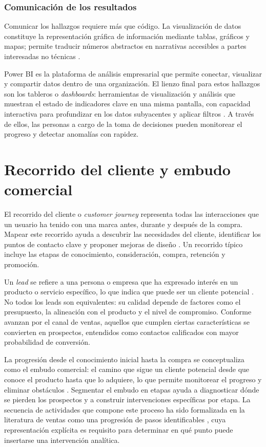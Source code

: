 \subsubsection{Comunicación de los resultados}

Comunicar los hallazgos requiere más que código. La visualización de datos
constituye la representación gráfica de información mediante tablas, gráficos y
mapas; permite traducir números abstractos en narrativas accesibles a partes
interesadas no técnicas \cite{tableau_dataviz}.

Power BI es la plataforma de análisis empresarial que permite conectar, visualizar
y compartir datos dentro de una organización. El lienzo final para estos hallazgos
son los tableros o \emph{dashboards}: herramientas de visualización y análisis que
muestran el estado de indicadores clave en una misma pantalla, con capacidad
interactiva para profundizar en los datos subyacentes y aplicar filtros
\cite{hashemipour2024dashboard}. A través de ellos, las personas a cargo de la toma
de decisiones pueden monitorear el progreso y detectar anomalías con rapidez.

\section{Recorrido del cliente y embudo comercial}

El recorrido del cliente o \emph{customer journey} representa todas las
interacciones que un usuario ha tenido con una marca antes, durante y después de la
compra. Mapear este recorrido ayuda a descubrir las necesidades del cliente,
identificar los puntos de contacto clave y proponer mejoras de diseño
\cite{miller2025journey}. Un recorrido típico incluye las etapas de conocimiento,
consideración, compra, retención y promoción.

Un \emph{lead} se refiere a una persona o empresa que ha expresado interés en un
producto o servicio específico, lo que indica que puede ser un cliente potencial
\cite{salesforce2024prospect}. No todos los leads son equivalentes: su calidad
depende de factores como el presupuesto, la alineación con el producto y el nivel
de compromiso. Conforme avanzan por el canal de ventas, aquellos que cumplen
ciertas características se convierten en prospectos, entendidos como contactos
calificados con mayor probabilidad de conversión.

La progresión desde el conocimiento inicial hasta la compra se conceptualiza como
el embudo comercial: el camino que sigue un cliente potencial desde que
conoce el producto hasta que lo adquiere, lo que permite monitorear el progreso y
eliminar obstáculos \cite{long2023funnel}. Segmentar el embudo en etapas ayuda a
diagnosticar dónde se pierden los prospectos y a construir intervenciones
específicas por etapa. La secuencia de actividades que compone este proceso ha sido
formalizada en la literatura de ventas como una progresión de pasos identificables
\cite{moncrief2005evolution}, cuya representación explícita es requisito para
determinar en qué punto puede insertarse una intervención analítica.


